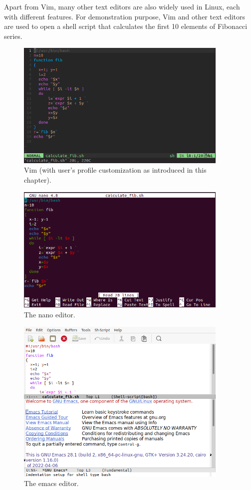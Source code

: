 Apart from Vim, many other text editors are also widely used in Linux, each with different features. For demonstration purpose, Vim and other text editors are used to open a shell script that calculates the first 10 elements of Fibonacci series.

\begin{figure}[!htb]
	\centering
	\includegraphics[width=4in]{chapters/part-1/figures/vim_fib.png}
	\caption{Vim (with user's profile customization as introduced in this chapter).}
\end{figure}

\begin{figure}[!htb]
	\centering
	\includegraphics[width=4in]{chapters/part-1/figures/nano_fib.png}
	\caption{The nano editor.}
\end{figure}

\begin{figure}[!htb]
	\centering
	\includegraphics[width=4in]{chapters/part-1/figures/emacs_fib.png}
	\caption{The emacs editor.}
\end{figure}

